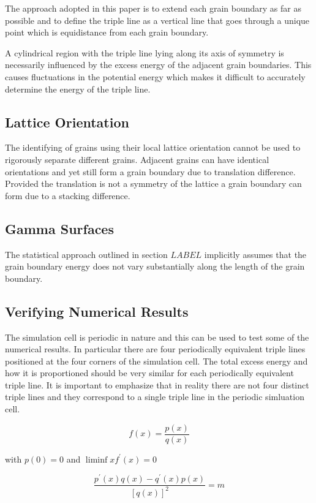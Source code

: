 \documentclass[12pt,a4paper]{book}
\begin{document}
The approach adopted in this paper is to extend each grain boundary as far as possible and to define the triple line as a vertical line that goes through a unique point which is equidistance from each grain boundary. 

A cylindrical region with the triple line lying along its axis of symmetry is necessarily influenced by the excess energy of the adjacent grain boundaries. This causes fluctuations in the potential energy which makes it difficult to accurately determine the energy of the triple line.
\subsection{Lattice Orientation}

The identifying of grains using their local lattice orientation cannot be used to rigorously separate different grains. Adjacent grains can have identical orientations and yet still form a grain boundary due to translation difference. Provided the translation is not a symmetry of the lattice a grain boundary can form due to a stacking difference.

\subsection{Gamma Surfaces}

The statistical approach outlined in section $LABEL$ implicitly assumes that the grain boundary energy does not vary substantially along the length of the grain boundary.

\subsection{Verifying Numerical Results}

The simulation cell is periodic in nature and this can be used to test some of the numerical results. In particular there are four periodically equivalent triple lines positioned at the four corners of the simulation cell. The total excess energy and how it is proportioned should be very similar for each periodically equivalent triple line. It is important to emphasize that in reality there are not four distinct triple lines and they correspond to a single triple line in the periodic simluation cell.


\[ f(x) = \frac{p(x)}{q(x)} \]

with $p(0)=0$ and $\liminf{x}{f^{\prime}(x)}=0$

\[ \frac{p^{\prime}(x)q(x) -q^{\prime}(x)p(x)}{[q(x)]^2} = m\]
\end{document}
